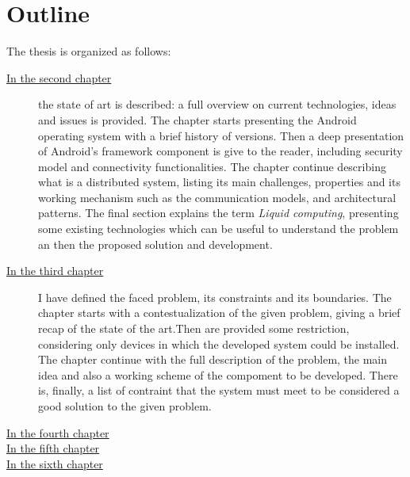 \section{Outline}
%
\par The thesis is organized as follows:
%
%
\begin{description}
%
\item[{\hyperref[cap:statoarte]{In the second chapter}}] the state of art is described: a full overview on current technologies, ideas and issues is provided. The chapter starts presenting the Android operating system with a brief history of versions. Then a deep presentation of Android's framework component is give to the reader, including security model and connectivity functionalities. The chapter continue describing what is a distributed system, listing its main challenges, properties and its working mechanism such as the communication models, and architectural patterns. The final section explains the term \textit{Liquid computing}, presenting some existing technologies which can be useful to understand the problem an then the proposed solution and development.
%
\item[{\hyperref[cap:probanalysis]{In the third chapter}}] I have defined the faced problem, its constraints and its boundaries. The chapter starts with a contestualization of the given problem, giving a brief recap of the state of the art.Then are provided some restriction, considering only devices in which the developed system could be installed. The chapter continue with the full description of the problem, the main idea and also a working scheme of the compoment to be developed. There is, finally, a list of contraint that the system must meet to be considered a good solution to the given problem.

\item[{\hyperref[cap:proposedsolution]{In the fourth chapter}}] 

\item[{\hyperref[cap:proofofconcept]{In the fifth chapter}}]

\item[{\hyperref[cap:conclusions]{In the sixth chapter}}]
%
\end{description}
%

